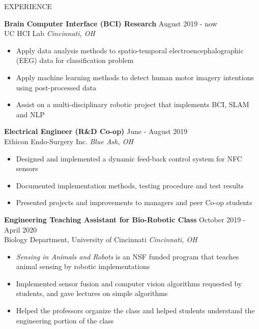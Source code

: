 \documentclass{resume} %
\begin{document}
	\begin{rSection}{EXPERIENCE}
		
		\textbf{Brain Computer Interface (BCI) Research} \hfill August 2019 - now \\
		UC HCI Lab \hfill \textit{Cincinnati, OH}
		\begin{itemize}
			\itemsep -4pt {} 
			\item Apply data analysis methods to spatio-temporal electroencephalographic (EEG) data for classification problem
			\item Apply machine learning methods to detect human motor imagery intentions using post-processed data
			\item Assist on a multi-disciplinary robotic project that implements BCI, SLAM and NLP 
		\end{itemize}


		\textbf{Electrical Engineer (R\&D Co-op)} \hfill June - August 2019\\
		Ethicon Endo-Surgery Inc. \hfill \textit{Blue Ash, OH}
		\begin{itemize}
			\itemsep -4pt {} 
			\item Designed and implemented a dynamic feed-back control system for NFC sensors 
			\item Documented implementation methods, testing procedure and test results
			\item Presented projects and improvements to managers and peer Co-op students
		\end{itemize}
		
		
		\textbf{Engineering Teaching Assistant for Bio-Robotic Class} \hfill October 2019 - April 2020\\
		Biology Department, University of Cincinnati \hfill \textit{Cincinnati, OH}
		\begin{itemize}
			\itemsep -4pt {} 
			\item \textit{Sensing in Animals and Robots} is an NSF funded program that teaches animal sensing by robotic implementations
			\item Implemented sensor fusion and computer vision algorithms requested by students, and gave lectures on simple algorithms
			\item Helped the professors organize the class and helped students understand the engineering portion of the class
		\end{itemize}
		

\end{rSection}
\end{document}
